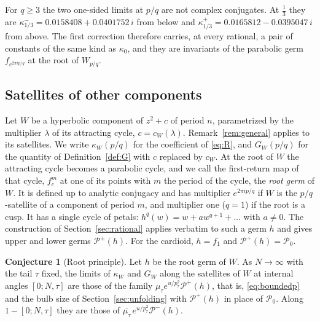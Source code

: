 \documentclass[11pt]{amsart}
\theoremstyle{definition}
\newtheorem{conjecture}[theorem]{Conjecture}
\theoremstyle{remark}
\newcommand{\PP}{\mathcal{P}_0}
\newcommand{\fa}[1]{f_{e^{2\pi i#1}}}
\begin{document}
\begin{table}[t]
\centering\scriptsize

\caption{One-sided limits of $\kappa$ at rationals: the upper (``above'') or lower (``below'') horn map of $e^{2\pi ip/q}z+z^2$, with the tail rule of Conjecture~\ref{conj:rational}, against the bulbs $[0;a_1,\ldots,a_\ell,N,\tau]$ extrapolated from $N=128,\dots,2048$. The row $2/5$ below equals the complex conjugate of $3/5$ above, by the symmetry $\kappa(1-x)=\overline{\kappa(x)}$. The last four rows test the conjugate phase $\overline{\mu_\tau}$ with $p_\tau=3$.}\label{tab:rational}
\end{table}

For $q\ge3$ the two one-sided limits at $p/q$ are not complex conjugates. At $\frac13$ they are $\kappa^-_{1/3}=0.0158408+0.0401752\,i$ from below and $\kappa^+_{1/3}=0.0165812-0.0395047\,i$ from above. The first correction therefore carries, at every rational, a pair of constants of the same kind as $\kappa_0$, and they are invariants of the parabolic germ $\fa{p/q}$ at the root of $W_{p/q}$.

\subsection{Satellites of other components}\label{sec:othercomp}
Let $W$ be a hyperbolic component of $z^2+c$ of period $n$, parametrized by the multiplier $\lambda$ of its attracting cycle, $c=c_W(\lambda)$. Remark~\ref{rem:general} applies to its satellites. We write $\kappa_W(p/q)$ for the coefficient of \eqref{eq:R}, and $G_W(p/q)$ for the quantity of Definition~\ref{def:G} with $c$ replaced by $c_W$. At the root of $W$ the attracting cycle becomes a parabolic cycle, and we call the first-return map of that cycle, $f_c^m$ at one of its points with $m$ the period of the cycle, the \emph{root germ} of $W$. It is defined up to analytic conjugacy and has multiplier $e^{2\pi ip/q}$ if $W$ is the $p/q$-satellite of a component of period $m$, and multiplier one ($q=1$) if the root is a cusp. It has a single cycle of petals: $h^q(w)=w+aw^{q+1}+\dots$ with $a\ne0$. The construction of Section~\ref{sec:rational} applies verbatim to such a germ $h$ and gives upper and lower germs $\mathcal P^\pm(h)$. For the cardioid, $h=f_1$ and $\mathcal P^+(h)=\PP$.

\begin{conjecture}[Root principle]\label{conj:root}
Let $h$ be the root germ of $W$. As $N\to\infty$ with the tail $\tau$ fixed, the limits of $\kappa_W$ and $G_W$ along the satellites of $W$ at internal angles $[0;N,\tau]$ are those of the family $\mu_\tau e^{u/p_\tau^2}\mathcal P^+(h)$, that is, \eqref{eq:boundedp} and the bulb size of Section~\ref{sec:unfolding} with $\mathcal P^+(h)$ in place of $\PP$. Along $1-[0;N,\tau]$ they are those of $\overline{\mu_\tau}\,e^{u/p_\tau^2}\mathcal P^-(h)$.
\end{conjecture}
\end{document}
